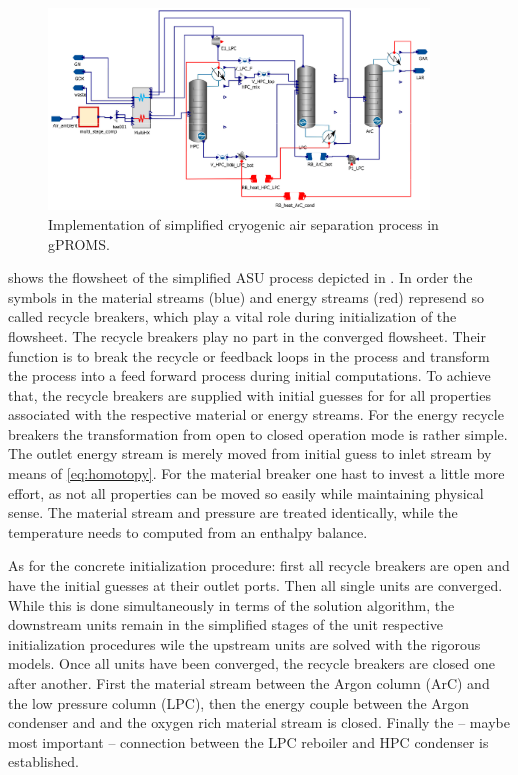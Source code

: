         \begin{figure}
            \centering
            \includegraphics[width=0.9\textwidth]{Pictures/ASU_simple_gPROMS.eps}
            \caption{Implementation of simplified cryogenic air separation process in gPROMS.}
            \label{fig:ASU_simple_gproms}
        \end{figure}

         shows the flowsheet of the simplified ASU process depicted in .
        In order the symbols in the material streams (blue) and energy streams (red) represend so called recycle breakers, which
        play a vital role during initialization of the flowsheet. The recycle breakers play no part in the converged flowsheet.
        Their function is to break the recycle or feedback loops in the process and transform the process into a feed forward process
        during initial computations. To achieve that, the recycle breakers are supplied with initial guesses for for all properties
        associated with the respective material or energy streams. For the energy recycle breakers the transformation from open to
        closed operation mode is rather simple. The outlet energy stream is merely moved from initial guess to inlet stream by
        means of \eqref{eq:homotopy}. For the material breaker one hast to invest a little more effort, as not all properties can be
        moved so easily while maintaining physical sense. The material stream and pressure are treated identically, while the temperature
        needs to computed from an enthalpy balance.

        As for the concrete initialization procedure: first all recycle breakers are open and have the initial guesses at their outlet
        ports. Then all single units are converged. While this is done simultaneously in terms of the solution algorithm, the downstream
        units remain in the simplified stages of the unit respective initialization procedures wile the upstream units are solved with the
        rigorous models. Once all units have been converged, the recycle breakers are closed one after another. First the material stream
        between the Argon column (ArC) and the low pressure column (LPC), then the energy couple between the Argon condenser and
        and the oxygen rich material stream is closed. Finally the -- maybe most important -- connection between the LPC reboiler
        and HPC condenser is established.
